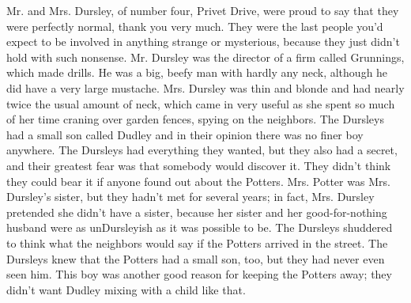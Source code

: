 \documentclass{article}%
\begin{document}
\newline%
Mr. and Mrs. Dursley, of number four, Privet Drive, were proud to say
\newline%
that they were perfectly normal, thank you very much. They were the last
\newline%
people you'd expect to be involved in anything strange or mysterious,
\newline%
because they just didn't hold with such nonsense.
\newline%
Mr. Dursley was the director of a firm called Grunnings, which made
\newline%
drills. He was a big, beefy man with hardly any neck, although he did
\newline%
have a very large mustache. Mrs. Dursley was thin and blonde and had
\newline%
nearly twice the usual amount of neck, which came in very useful as she
\newline%
spent so much of her time craning over garden fences, spying on the
\newline%
neighbors. The Dursleys had a small son called Dudley and in their
\newline%
opinion there was no finer boy anywhere.
\newline%
The Dursleys had everything they wanted, but they also had a secret, and
\newline%
their greatest fear was that somebody would discover it. They didn't
\newline%
think they could bear it if anyone found out about the Potters. Mrs.
\newline%
Potter was Mrs. Dursley's sister, but they hadn't met for several years;
\newline%
in fact, Mrs. Dursley pretended she didn't have a sister, because her
\newline%
sister and her good{-}for{-}nothing husband were as unDursleyish as it was
\newline%
possible to be. The Dursleys shuddered to think what the neighbors would
\newline%
say if the Potters arrived in the street. The Dursleys knew that the
\newline%
Potters had a small son, too, but they had never even seen him. This boy
\newline%
was another good reason for keeping the Potters away; they didn't want
\newline%
Dudley mixing with a child like that.
\newline%
\end{document}

